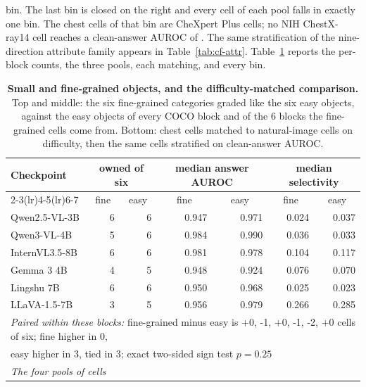 \documentclass{article}
\begin{document}
bin. The last bin is closed on the right and every cell of each pool falls in exactly one bin. The \cfStratChestTopN{} chest cells of that bin are CheXpert Plus cells; no NIH ChestX-ray14 cell reaches a clean-answer AUROC of \cfStratTopEdge{}. The same stratification of the nine-direction attribute family appears in Table~\ref{tab:cf-attr}. Table~\ref{tab:cf-fgobj} reports the per-block counts, the three pools, each matching, and every bin.

\begin{table}[htbp]
\centering
\scriptsize
\setlength{\tabcolsep}{4pt}
\setlength{\abovecaptionskip}{2pt}
\setlength{\belowcaptionskip}{0pt}
\renewcommand{\arraystretch}{0.95}
\caption{\textbf{Small and fine-grained objects, and the difficulty-matched comparison.} Top and middle: the six fine-grained categories graded like the six easy objects, against the easy objects of every COCO block and of the 6 blocks the fine-grained cells come from. Bottom: chest cells matched to natural-image cells on difficulty, then the same cells stratified on clean-answer AUROC.}
\label{tab:cf-fgobj}
\begin{tabular}{lrrrrrr}
\toprule
\multirow{2}{*}{Checkpoint} & \multicolumn{2}{c}{owned of six} & \multicolumn{2}{c}{median answer AUROC} & \multicolumn{2}{c}{median selectivity}\\
\cmidrule(lr){2-3}\cmidrule(lr){4-5}\cmidrule(lr){6-7}
& \multicolumn{1}{c}{fine} & \multicolumn{1}{c}{easy} & \multicolumn{1}{c}{fine} & \multicolumn{1}{c}{easy} & \multicolumn{1}{c}{fine} & \multicolumn{1}{c}{easy}\\
\midrule
Qwen2.5-VL-3B & 6 & 6 & 0.947 & 0.971 & 0.024 & 0.037 \\
Qwen3-VL-4B & 5 & 6 & 0.984 & 0.990 & 0.036 & 0.033 \\
InternVL3.5-8B & 6 & 6 & 0.981 & 0.978 & 0.104 & 0.117 \\
Gemma 3 4B & 4 & 5 & 0.948 & 0.924 & 0.076 & 0.070 \\
Lingshu 7B & 6 & 6 & 0.950 & 0.968 & 0.025 & 0.023 \\
LLaVA-1.5-7B & 3 & 5 & 0.956 & 0.979 & 0.266 & 0.285 \\
\midrule
\multicolumn{7}{l}{\textit{Paired within these blocks:} fine-grained minus easy is +0, -1, +0, -1, -2, +0 cells of six; fine higher in 0,} \\
\multicolumn{7}{l}{easy higher in 3, tied in 3; exact two-sided sign test $p=0.25$} \\
\midrule
\multicolumn{7}{l}{\textit{The four pools of cells}} \\

\end{tabular}
\end{table}
\end{document}
